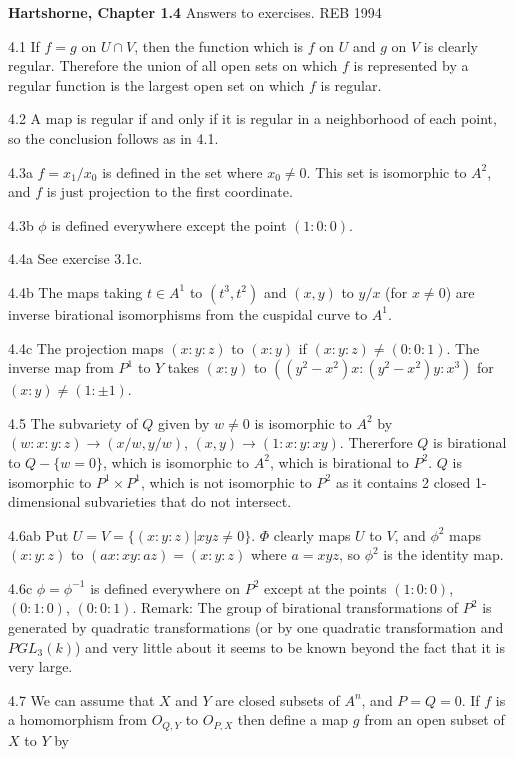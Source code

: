 \def\Z{{\bf Z}}
{\bf Hartshorne, Chapter 1.4}
Answers to exercises. \hfill REB 1994
\item{4.1} If $f=g$ on $U\cap V$, then the function which is $f$ on $U$ 
and $g$ on $V$ is clearly regular. Therefore the union of all open
sets on which $f$ is represented by a regular function is the largest
open set on which $f$ is regular.
\item{4.2} A map is regular if and only if it is regular in a neighborhood
of each point, so the conclusion follows as in 4.1.
\item{4.3a} $f=x_1/x_0$ is defined in the set where $x_0\ne 0$. 
This set is isomorphic to $A^2$, and $f$ is just projection to
the first coordinate. 
\item{4.3b} $\phi$ is defined everywhere except the point $(1:0:0)$. 
\item{4.4a} See exercise 3.1c.
\item{4.4b} The maps taking $t\in A^1$ to $(t^3,t^2)$ 
and $(x,y)$ to $y/x$ (for $x\ne 0$) are inverse birational
isomorphisms from the cuspidal curve to $A^1$. 
\item{4.4c} The projection maps $(x:y:z)$ to $(x:y)$ if $(x:y:z)\ne (0:0:1)$.
The inverse map from $P^1$ to $Y$ takes $(x:y)$ to
$((y^2-x^2)x:(y^2-x^2)y:x^3)$ for $(x:y)\ne (1:\pm 1)$. 
\item{4.5} The subvariety of $Q$  given by $w\ne 0$ is isomorphic
to $A^2$ by $(w:x:y:z)\rightarrow (x/w,y/w)$, $(x,y)\rightarrow (1:x:y:xy)$.
Thererfore $Q$ is birational to $Q-\{w=0\}$, which is isomorphic
to $A^2$, which is birational to $P^2$. $Q$ is isomorphic to 
$P^1\times P^1$, which is not isomorphic to $P^2$ as it contains
2 closed 1-dimensional subvarieties that do not intersect. 
\item{4.6ab} Put $U=V=\{(x:y:z)|xyz\ne 0\}$. $\Phi$ clearly maps
$U$ to $V$, and $\phi^2$ maps $(x:y:z)$ to $(ax:xy:az)=(x:y:z)$
where $a=xyz$, so $\phi^2$ is the identity map. 
\item{4.6c} $\phi=\phi^{-1}$  is defined everywhere 
on $P^2$ except at the points $(1:0:0)$, $(0:1:0)$, $(0:0:1)$. 
Remark: The group of birational transformations
of $P^2$ is generated by quadratic transformations
(or by one quadratic transformation and $PGL_3(k)$)
and very little about it seems to be known
beyond the fact that it is very large.
\item{4.7} We can assume that $X$ and $Y$ are closed subsets of $A^n$,
and $P=Q=0$. If $f$ is a homomorphism from $O_{Q,Y}$ to
$O_{P,X}$ then define a map $g$ from an open subset 
of $X$ to $Y$ by 
